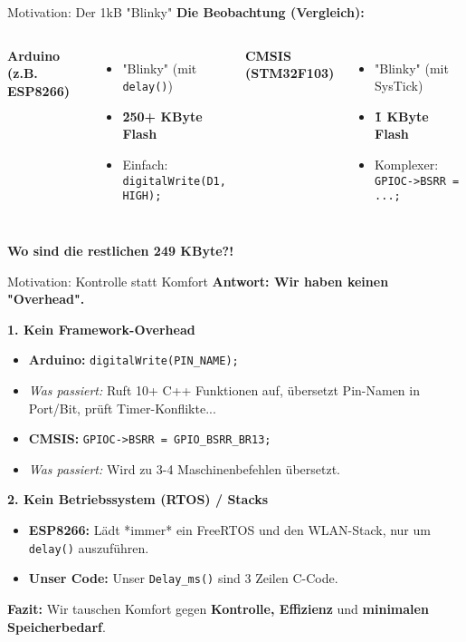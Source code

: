 \documentclass{beamer}
\begin{document}
\begin{frame}{Motivation: Der 1kB "Blinky"}
	\textbf{Die Beobachtung (Vergleich):}
	
	\medskip
	\begin{columns}
		\textbf{Arduino (z.B. ESP8266)}
		\begin{itemize}
			\item "Blinky" (mit \texttt{delay()})
			\item \textbf{\~250+ KByte Flash}
			\item Einfach: \texttt{digitalWrite(D1, HIGH);}
		\end{itemize}
		
		\textbf{CMSIS (STM32F103)}
		\begin{itemize}
			\item "Blinky" (mit SysTick)
			\item \textbf{\~1 KByte Flash}
			\item Komplexer: \texttt{GPIOC->BSRR = ...;}
		\end{itemize}
	\end{columns}
	
	\bigskip
	\begin{center}
		\Large\textbf{Wo sind die restlichen 249 KByte?!}
	\end{center}
\end{frame}

\begin{frame}[fragile]{Motivation: Kontrolle statt Komfort}
	\textbf{Antwort: Wir haben keinen "Overhead".}
	
	\medskip
	\textbf{1. Kein Framework-Overhead}
	\begin{itemize}
		\item \textbf{Arduino:} \texttt{digitalWrite(PIN\_NAME);}
		\item \textit{Was passiert:} Ruft 10+ C++ Funktionen auf, übersetzt Pin-Namen in Port/Bit, prüft Timer-Konflikte...
		\item \textbf{CMSIS:} \texttt{GPIOC->BSRR = GPIO\_BSRR\_BR13;}
		\item \textit{Was passiert:} Wird zu 3-4 Maschinenbefehlen übersetzt.
	\end{itemize}
	
	\medskip
	\textbf{2. Kein Betriebssystem (RTOS) / Stacks}
	\begin{itemize}
		\item \textbf{ESP8266:} Lädt *immer* ein FreeRTOS und den WLAN-Stack, nur um \texttt{delay()} auszuführen.
		\item \textbf{Unser Code:} Unser \texttt{Delay\_ms()} sind 3 Zeilen C-Code.
	\end{itemize}
	
	\medskip
	\rightarrow \textbf{Fazit:} Wir tauschen Komfort gegen \textbf{Kontrolle, Effizienz} und \textbf{minimalen Speicherbedarf}.
\end{frame}
\end{document}
